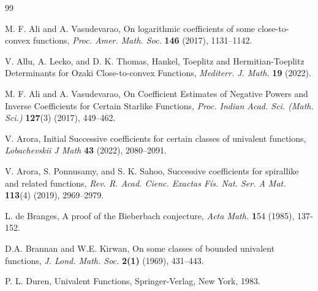 \documentclass[a4paper,12pt]{amsart}
\theoremstyle{definition}
\numberwithin{equation}{section}
\begin{document}
\begin{thebibliography}{99}
	
{\sc M. F. Ali} and {\sc A. Vasudevarao}, On logarithmic coefficients of some close-to-convex functions, {\it Proc. Amer. Math. Soc.} {\bf 146} (2017), 1131--1142.
	
	
		{\sc V. Allu, A. Lecko,} and {\sc D. K. Thomas},
	{Hankel, Toeplitz and Hermitian-Toeplitz Determinants for Ozaki Close-to-convex Functions}, {\em Mediterr. J. Math.} \textbf{19}  (2022).
	
 {\sc M. F. Ali} and {\sc A. Vasudevarao},
{On Coefficient Estimates of Negative Powers and 
	Inverse Coefficients for Certain Starlike Functions},
{\em Proc. Indian Acad. Sci. (Math. Sci.)} \textbf{127}(3) (2017), 449--462.

	
%

 {\sc V. Arora},
{Initial Successive coefficients for certain classes of univalent functions}, {\it Lobachevskii J Math} {\bf 43} (2022), 2080--2091.

 {\sc V. Arora, S. Ponnusamy}, and {\sc S. K. Sahoo},
{Successive coefficients for spirallike and related functions}, 
{\em Rev. R. Acad. Cienc. Exactas F\'{i}s. Nat. Ser. A Mat.} {\bf 113}(4) (2019), 2969--2979.

{\sc L. de Branges}, A proof of the Bieberbach conjecture, {\em Acta  Math.} {\textbf 154} (1985), 137-152.




	{\sc D.A. Brannan} and {\sc W.E. Kirwan}, On some classes of bounded univalent functions, {\it J. Lond. Math. Soc.} {\bf 2(1)} (1969), 431--443.

 {\sc P. L. Duren,}
{Univalent Functions},
Springer-Verlag, New York, 1983.



\end{thebibliography}
\end{document}
